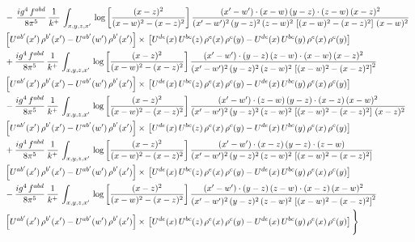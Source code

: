 \documentclass[9pt]{article}
\numberwithin{equation}{section}
\begin{document}
{\begin{align*}
& -\,\frac{ig^{4}\, f^{abd}}{8\pi^{5}}\, \frac{1}{k^{+}}\, \int_{x,y,z,x'}\,\log{\left[\frac{(x-z)^{2}}{(x-w)^{2}-(x-z)^{2}}\right]}\,\frac{(x'-w')\cdot (x-w)\, (y-z)\cdot(z-w)\,(x-z)^{2}}{(x'-w')^{2}\, (y-z)^{2}\, (z-w)^{2}\,\left[(x-w)^{2}-(x-z)^{2}\right]\,(x-w)^{2}}\, \notag \\ & \left[U^{ab'}(x')\,\rho^{b'}(x')-U^{ab'}(w')\, \rho^{b'}(x')\right]\times\,\left[U^{de}(x)\,U^{bc}(z)\, \rho^{e}(x)\,\rho^{c}(y)-U^{de}(x)\,U^{bc}(y)\,\rho^{e}(x)\,\rho^{c}(y)\right] \notag \\
& +\frac{ig^{4}\, f^{abd}}{8\pi^{5}}\, \frac{1}{k^{+}}\, \int_{x,y,z,x'}\,\log{\left[\frac{(x-z)^{2}}{(x-w)^{2}-(x-z)^{2}}\right]}\,\frac{(x'-w')\cdot  (y-z)\, (z-w)\cdot (x-w)\, (x-z)^{2}}{(x'-w')^{2}\, (y-z)^{2}\, (z-w)^{2}\,\left[(x-w)^{2}-(x-z)^{2}\right]^{2}}\, \notag \\ & \left[U^{ab'}(x')\,\rho^{b'}(x')-U^{ab'}(w')\, \rho^{b'}(x')\right]\times\,\left[U^{de}(x)\,U^{bc}(z)\, \rho^{e}(x)\,\rho^{c}(y)-U^{de}(x)\,U^{bc}(y)\,\rho^{e}(x)\,\rho^{c}(y)\right] \notag \\
& - \frac{ig^{4}\, f^{abd}}{8\pi^{5}}\, \frac{1}{k^{+}}\, \int_{x,y,z,x'}\,\log{\left[\frac{(x-z)^{2}}{(x-w)^{2}-(x-z)^{2}}\right]}\,\frac{(x'-w')\cdot (z-w)\, (y-z)\cdot (x-z)\, (x-w)^{2}}{(x'-w')^{2}\, (y-z)^{2}\, (z-w)^{2}\,\left[(x-w)^{2} - (x-z)^{2}\right]\, (x-z)^{2}}\, \notag \\ & \left[U^{ab'}(x')\,\rho^{b'}(x')-U^{ab'}(w')\, \rho^{b'}(x')\right]\times\,\left[U^{de}(x)\,U^{bc}(z)\, \rho^{e}(x)\,\rho^{c}(y)-U^{de}(x)\,U^{bc}(y)\,\rho^{e}(x)\,\rho^{c}(y)\right] \notag \\
& +\frac{ig^{4}\, f^{abd}}{8\pi^{5}}\, \frac{1}{k^{+}}\, \int_{x,y,z,x'}\,\log{\left[\frac{(x-z)^{2}}{(x-w)^{2}-(x-z)^{2}}\right]}\,\frac{(x'-w')\cdot (x-z)\, (y-z)\cdot (z-w)}{(x'-w')^{2}\, (y-z)^{2}\, (z-w)^{2}\,\left[(x-w)^{2} -(x-z)^{2}\right]}\, \notag \\ & \left[U^{ab'}(x')\,\rho^{b'}(x')-U^{ab'}(w')\, \rho^{b'}(x')\right]\times\,\left[U^{de}(x)\,U^{bc}(z)\, \rho^{e}(x)\,\rho^{c}(y)-U^{de}(x)\,U^{bc}(y)\,\rho^{e}(x)\,\rho^{c}(y)\right] \notag \\
& -\frac{ig^{4}\, f^{abd}}{8\pi^{5}}\, \frac{1}{k^{+}}\, \int_{x,y,z,x'}\,\log{\left[\frac{(x-z)^{2}}{(x-w)^{2}-(x-z)^{2}}\right]}\,\frac{(x'-w')\cdot (y-z)\, (z-w)\cdot (x-z)\,(x-w)^{2}}{(x'-w')^{2}\, (y-z)^{2}\, (z-w)^{2}\,\left[(x-w)^{2}-(x-z)^{2}\right]^{2}}\, \notag \\ & \left[U^{ab'}(x')\,\rho^{b'}(x')-U^{ab'}(w')\, \rho^{b'}(x')\right]\times\,\left[U^{de}(x)\,U^{bc}(z)\, \rho^{e}(x)\,\rho^{c}(y)-U^{de}(x)\,U^{bc}(y)\,\rho^{e}(x)\,\rho^{c}(y)\right]\Bigg\}

\end{align*}}
\end{document}
